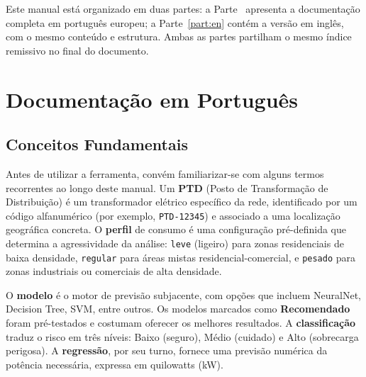 \documentclass[11pt,a4paper,openany]{book}
\newcommand{\ptd}{PTD}
\newcommand{\kw}{kW}
\begin{document}
\vspace{1em}
\begin{notebox}
Este manual está organizado em duas partes: a Parte~\ref{part:pt} apresenta a documentação completa em português europeu; a Parte~\ref{part:en} contém a versão em inglês, com o mesmo conteúdo e estrutura. Ambas as partes partilham o mesmo índice remissivo no final do documento.
\end{notebox}

\tableofcontents

\mainmatter

\part{Documentação em Português}\label{part:pt}

\chapter{Conceitos Fundamentais}\label{ch:conceitos}

Antes de utilizar a ferramenta, convém familiarizar-se com alguns termos recorrentes ao longo deste manual. Um \textbf{\ptd} (Posto de Transformação de Distribuição) é um transformador elétrico específico da rede, identificado por um código alfanumérico (por exemplo, \texttt{PTD-12345}) e associado a uma localização geográfica concreta. O \textbf{perfil} de consumo é uma configuração pré-definida que determina a agressividade da análise: \texttt{leve} (ligeiro) para zonas residenciais de baixa densidade, \texttt{regular} para áreas mistas residencial-comercial, e \texttt{pesado} para zonas industriais ou comerciais de alta densidade.

O \textbf{modelo} é o motor de previsão subjacente, com opções que incluem NeuralNet, Decision Tree, SVM, entre outros. Os modelos marcados como \textbf{Recomendado} foram pré-testados e costumam oferecer os melhores resultados. A \textbf{classificação} traduz o risco em três níveis: Baixo (seguro), Médio (cuidado) e Alto (sobrecarga perigosa). A \textbf{regressão}, por seu turno, fornece uma previsão numérica da potência necessária, expressa em quilowatts (\kw).
\end{document}

